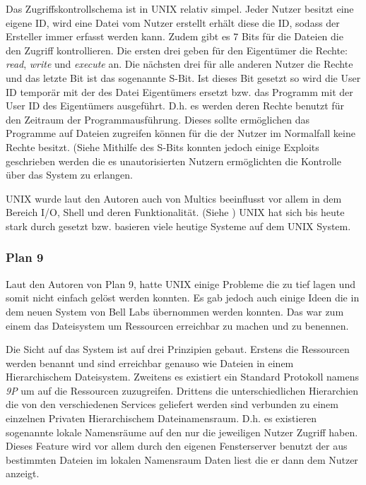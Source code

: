 \documentclass[11pt,technote]{IEEEtran}
\begin{document}
		    Das Zugriffskontrollschema ist in UNIX relativ simpel. Jeder Nutzer besitzt eine eigene ID, wird eine Datei vom Nutzer erstellt  erh\"alt diese die ID, sodass der Ersteller immer
		    erfasst werden kann. Zudem gibt es 7 Bits f\"ur die Dateien die den Zugriff kontrollieren. 
		    Die ersten drei geben f\"ur den Eigent\"umer die Rechte: \textit{read}, \textit{write} und \textit{execute} an.
		    Die n\"achsten drei f\"ur alle anderen Nutzer die Rechte und das letzte Bit ist das sogenannte S-Bit. Ist dieses Bit gesetzt so wird die User ID tempor\"ar
		    mit der des Datei Eigent\"umers ersetzt bzw. das Programm mit der User ID des Eigent\"umers ausgef\"uhrt.
		    D.h. es werden deren Rechte benutzt f\"ur den Zeitraum der Programmausf\"uhrung. Dieses sollte erm\"oglichen das Programme
		    auf Dateien zugreifen k\"onnen f\"ur die der Nutzer im Normalfall keine Rechte besitzt. (Siehe \cite[S. 367]{inproc:unix}    
		    Mithilfe des S-Bits konnten jedoch einige Exploits geschrieben werden die es unautorisierten Nutzern erm\"oglichten
		    die Kontrolle \"uber das System zu erlangen. 
		    
		    UNIX wurde laut den Autoren auch von Multics beeinflusst vor allem in dem Bereich I/O, Shell und deren Funktionalit\"at. (Siehe \cite[S. 374]{inproc:unix})
		    UNIX hat sich bis heute stark durch gesetzt bzw. basieren viele heutige Systeme auf dem UNIX System.
	    \subsubsection{Plan 9} \label{sec:secure:access:plan9}
        Laut den Autoren von Plan 9, hatte UNIX einige Probleme die zu tief lagen und somit nicht einfach gel\"ost werden konnten.
        Es gab jedoch auch einige Ideen die in dem neuen System von Bell Labs \"ubernommen werden konnten.
        Das war zum einem das Dateisystem um Ressourcen erreichbar zu machen und zu benennen.
    
        Die Sicht auf das System ist auf drei Prinzipien gebaut.
        Erstens die Ressourcen werden benannt und sind erreichbar genauso wie Dateien in einem Hierarchischem Dateisystem. 
        Zweitens es existiert ein Standard Protokoll namens \textit{9P} um auf die 
        Ressourcen zuzugreifen. Drittens die unterschiedlichen Hierarchien die von den verschiedenen Services geliefert
        werden sind verbunden zu einem einzelnen Privaten Hierarchischem Dateinamensraum. 
        D.h. es existieren sogenannte lokale Namensr\"aume auf den nur die jeweiligen Nutzer Zugriff haben.
        Dieses Feature wird vor allem durch den eigenen Fensterserver benutzt der aus bestimmten Dateien im lokalen 
        Namensraum Daten liest die er dann dem Nutzer anzeigt.
        
\end{document}
